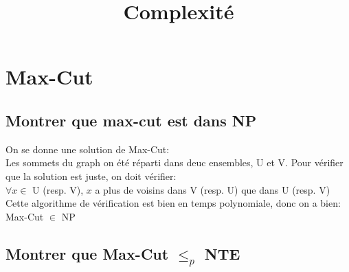 \documentclass[a4paper]{report}
\title{Complexité}
\begin{document}
\chapter*{Max-Cut}


\section{ Montrer que max-cut est dans NP }
On se donne une solution de Max-Cut:\\
Les sommets du graph on été réparti dans deuc ensembles, U et V. 
Pour vérifier que la solution est juste, on doit vérifier:\\
$ \forall x \in $ U (resp. V), $ x $ a plus de voisins dans V (resp. U) que dans U (resp. V)\\
Cette algorithme de vérification est bien en temps polynomiale, donc on a bien:\\
Max-Cut $ \in $ NP\\

\section{ Montrer que Max-Cut $ \leq_p $ NTE }
\end{document}
